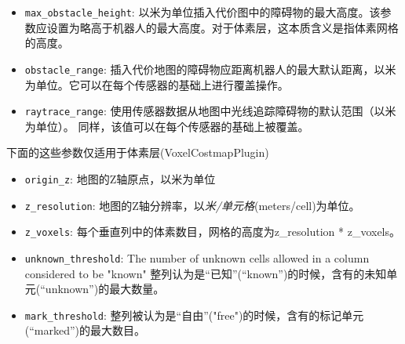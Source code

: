 \begin{itemize}
	\item \texttt{max\_obstacle\_height}: 
	以米为单位插入代价图中的障碍物的最大高度。该参数应设置为略高于机器人的最大高度。对于体素层，这本质含义是指体素网格的高度。
	
	\item \texttt{obstacle\_range}: 
	插入代价地图的障碍物应距离机器人的最大默认距离，以米为单位。它可以在每个传感器的基础上进行覆盖操作。
	
	\item \texttt{raytrace\_range}: 
	使用传感器数据从地图中光线追踪障碍物的默认范围（以米为单位）。 同样，该值可以在每个传感器的基础上被覆盖。
	
\end{itemize}

下面的这些参数仅适用于体素层(VoxelCostmapPlugin)
\begin{itemize}
	\item \texttt{origin\_z}: 
	地图的Z轴原点，以米为单位
	\item \texttt{z\_resolution}: 
	地图的Z轴分辨率，以\emph{米/单元格}(meters/cell)为单位。
	
	\item \texttt{z\_voxels}: 
	每个垂直列中的体素数目，网格的高度为z\_resolution * z\_voxels。
	
	\item \texttt{unknown\_threshold}: 
	The number of unknown cells allowed in a column considered to be "known"
	整列认为是“已知”(``known'')的时候，含有的未知单元(“unknown”)的最大数量。
	
	\item \texttt{mark\_threshold}: 
	整列被认为是“自由”("free")的时候，含有的标记单元(“marked”)的最大数目。
	
\end{itemize}

